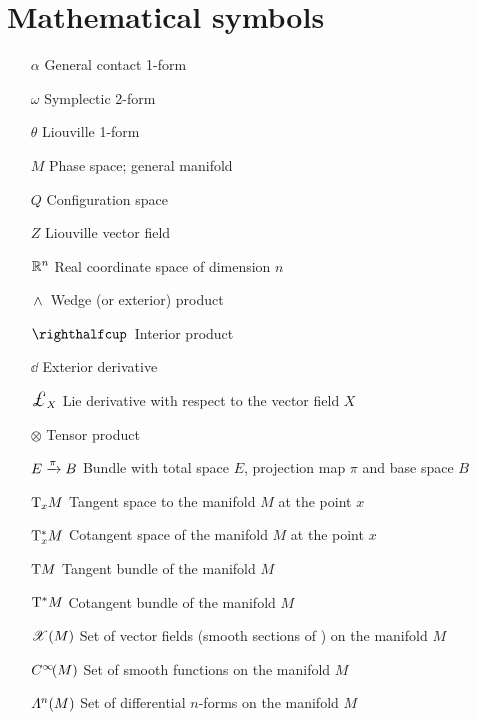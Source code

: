 \section*{Mathematical symbols}
\begin{itemize}[itemsep=0pt, leftmargin=2cm, labelsep=0cm, labelwidth=1.9cm, align=left]
    \item[$\alpha$] General contact 1-form
    \item[$\omega$] Symplectic 2-form
    \item[$\theta$] Liouville 1-form
%
    \item[$M$] Phase space; general manifold
    \item[$Q$] Configuration space
    \item[$Z$] Liouville vector field
%
    \item[$\mathbb{R}^n$] Real coordinate space of dimension $n$
%
%
    \item[$ \,\wedge\, $]  Wedge (or exterior) product
    \item[$\intpr{}{}$]  Interior product
    \item[$\dd{}$]  Exterior derivative
    \item[$\lied{X}{}$]  Lie derivative with respect to the vector field $X$
    \item[$\otimes$]  Tensor product
    \item[$E\xrightarrow[]{\pi}B$]  Bundle with total space $E$, projection map $\pi$ and base space $B$
    \item[$\mathrm{T}_{x}M$]  Tangent space to the manifold $M$ at the point $x$
    \item[$\mathrm{T}_{x}^*M$]  Cotangent space of the manifold $M$ at the point $x$
    \item[$\mathrm{T}M$]  Tangent bundle of the manifold $M$
    \item[$\mathrm{T}^*M$]  Cotangent bundle of the manifold $M$
    \item[$\mathscr{X}\qty(M)$]  Set of vector fields (smooth sections of ) on the manifold $M$
    \item[$C^\infty\!\qty(M)$]  Set of smooth functions on the manifold $M$
    \item[$\Lambda^{n}(M)$]  Set of differential $n$-forms on the manifold $M$
\end{itemize}